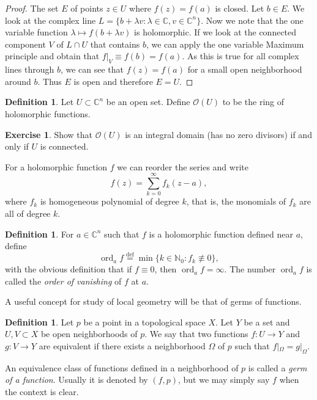 \documentclass[12pt,openany]{book}
\newcommand{\ord}{\operatorname{ord}}
\newcommand{\C}{{\mathbb{C}}}
\newcommand{\N}{{\mathbb{N}}}
\newcommand{\sO}{{\mathcal{O}}}
\newcommand{\myindex}[1]{#1\index{#1}}
\theoremstyle{plain}
\theoremstyle{remark}
\theoremstyle{definition}
\newtheorem{defn}[thm]{Definition}
\theoremstyle{exercise}
\newtheorem{exercise}{Exercise}[section]
\theoremstyle{example}
\begin{document}
\begin{proof}
The set $E$ of points $z \in U$ where $f(z) = f(a)$ is closed.
Let $b \in E$.  We look at the complex line $L = \{ b + \lambda v : \lambda
\in \C, v \in \C^n \}$.  Now we note that the one variable function
$\lambda \mapsto f(b + \lambda v)$ is holomorphic.  If we look at the
connected component $V$ of $L \cap U$ that contains $b$, we can apply
the one variable Maximum principle and obtain that $f|_V \equiv f(b) = f(a)$.
As this is true for all complex lines through $b$, we can see that
$f(z) = f(a)$ for a small open neighborhood around $b$.  Thus $E$ is open
and therefore $E = U$.
\end{proof}

\begin{defn}
Let $U \subset \C^n$ be an open set.
Define $\sO(U)$ to be the ring of holomorphic functions.
\end{defn}

\begin{exercise}
Show that $\sO(U)$ is an integral domain (has no zero divisors) if and only
if $U$ is connected.
\end{exercise}

For a holomorphic function $f$ we can reorder the series and write
\begin{equation}
f(z) = \sum_{k=0}^\infty f_k(z-a),
\end{equation}
where $f_k$ is homogeneous polynomial of degree $k$, that is, the
monomials of $f_k$ are all of degree $k$.

\begin{defn}
For $a \in \C^n$ such that $f$ is a holomorphic function defined near $a$,
define
\begin{equation}
\ord_a f \overset{\text{def}}{=} \min \{ k \in \N_0 : f_k \not\equiv 0 \} ,
\end{equation}
with the obvious definition that if $f \equiv 0$, then $\ord_a f = \infty$.
The number $\ord_a f$ is called the \emph{\myindex{order of vanishing}} of $f$ at $a$.
\end{defn}

A useful concept for study of local geometry will be that of germs of
functions.

\begin{defn}
Let $p$ be a point in a topological space $X$.  Let $Y$ be a set and
$U, V \subset X$ be open neighborhoods of $p$.  We say that
two functions $f \colon U \to Y$ and
$g \colon V \to Y$ are equivalent if there exists a neighborhood
$\Omega$ of $p$ such that $f|_\Omega = g|_\Omega$.

An equivalence class of functions defined in a neighborhood of $p$
is called a \emph{\myindex{germ of a function}}.
Usually it is denoted by $(f,p)$, but we may simply say $f$ when
the context is clear.
\end{defn}
\end{document}
